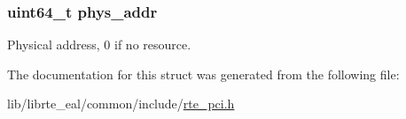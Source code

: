 \subsubsection[{phys\+\_\+addr}]{\setlength{\rightskip}{0pt plus 5cm}uint64\+\_\+t phys\+\_\+addr}\label{structrte__pci__resource_a09dd0be16c2bf772f79e04c7b881b61a}
Physical address, 0 if no resource. 

The documentation for this struct was generated from the following file\+:\begin{DoxyCompactItemize}
\item 
lib/librte\+\_\+eal/common/include/\hyperlink{rte__pci_8h}{rte\+\_\+pci.\+h}\end{DoxyCompactItemize}
